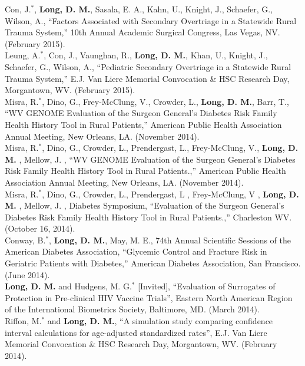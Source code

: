 \documentclass[10pt]{article}
\begin{document}
Con, J.$^\ast$, \textbf{Long, D. M.}, Sasala, E. A., Kahn, U., Knight, J., Schaefer, G., Wilson, A., ``Factors Associated with Secondary Overtriage in a Statewide Rural Trauma System,'' 10th Annual Academic Surgical Congress, Las Vegas, NV. (February 2015).\\
 
Leung, A.$^\ast$, Con, J., Vaunghan, R., \textbf{Long, D. M.}, Khan, U., Knight, J., Schaefer, G., Wilson, A.,  ``Pediatric Secondary Overtriage in a Statewide Rural Trauma System,'' E.J. Van Liere Memorial Convocation \& HSC Research Day, Morgantown, WV. (February 2015).\\
 
Misra, R.$^\ast$, Dino, G., Frey-McClung, V., Crowder, L., \textbf{Long, D. M.}, Barr, T.,  ``WV GENOME Evaluation of the Surgeon General's Diabetes Risk Family Health History Tool in Rural Patients,'' American Public Health Association Annual Meeting, New Orleans, LA. (November 2014).\\
 
Misra, R.$^\ast$, Dino, G., Crowder, L., Prendergast, L., Frey-McClung, V., \textbf{Long, D. M.} , Mellow, J.  , ``WV GENOME Evaluation of the Surgeon General's Diabetes Risk Family Health History Tool in Rural Patients.,'' American Public Health Association Annual Meeting, New Orleans, LA. (November 2014).\\
 
Misra, R.$^\ast$, Dino, G., Crowder, L., Prendergast, L , Frey-McClung, V , \textbf{Long, D. M.} , Mellow, J. , Diabetes Symposium, ``Evaluation of the Surgeon General's Diabetes Risk Family Health History Tool in Rural Patients.,'' Charleston WV. (October 16, 2014).\\
 
Conway, B.$^\ast$, \textbf{Long, D. M.}, May, M. E., 74th Annual Scientific Sessions of the American Diabetes Association, ``Glycemic Control and Fracture Risk in Geriatric Patients with Diabetes,'' American Diabetes Association, San Francisco. (June 2014).\\

\textbf{Long, D. M.} and Hudgens, M. G.$^\ast$ [Invited], ``Evaluation of Surrogates of Protection in Pre-clinical HIV Vaccine Trials'', Eastern North American Region of the International Biometrics Society, Baltimore, MD. (March 2014).\\

Riffon, M.$^\ast$  and \textbf{Long, D. M.}, ``A simulation study comparing confidence interval calculations for age-adjusted standardized rates'', E.J. Van Liere Memorial Convocation \& HSC Research Day, Morgantown, WV. (February 2014).\\
\end{document}
